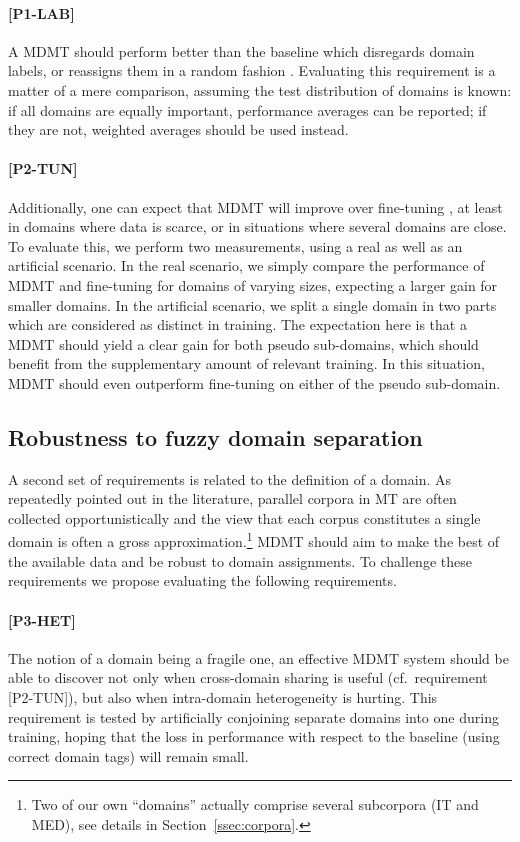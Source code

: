 \paragraph{[P1-LAB]} A MDMT should perform better than the baseline which disregards domain labels, or reassigns them in a random fashion \cite{Joshi12multidomain}. Evaluating this requirement is a matter of a mere comparison, assuming the test distribution of domains is known: if all domains are equally important, performance averages can be reported; if they are not, weighted averages should be used instead.

\paragraph{[P2-TUN]} Additionally, one can expect that MDMT will improve over fine-tuning \cite{Luong15stanford,Freitag16fast}, at least in domains where data is scarce, or in situations where several domains are close. To evaluate this, we perform two measurements, using a real as well as an artificial scenario. In the real scenario, we simply compare the performance of MDMT and fine-tuning for domains of varying sizes, expecting a larger gain for smaller domains. In the artificial scenario, we split a single domain in two parts which are considered as distinct in training. The expectation here is that a MDMT should yield a clear gain for both pseudo sub-domains, which should benefit from the supplementary amount of relevant training. In this situation, MDMT should even outperform fine-tuning on either of the pseudo sub-domain.

\subsection{Robustness to fuzzy domain separation \label{ssec:robusness}}
A second set of requirements is related to the definition of a domain. As repeatedly pointed out in the literature, parallel corpora in MT are often collected opportunistically and the view that each corpus constitutes a single domain is often a gross approximation.\footnote{Two of our own ``domains'' actually comprise several subcorpora (IT and MED), see details in Section~\ref{ssec:corpora}.} MDMT should aim to make the best of the available data and be robust to domain assignments. To challenge these requirements we propose evaluating the following requirements.

\paragraph{[P3-HET]}
The notion of a domain being a fragile one, an effective MDMT system should be able to discover not only when cross-domain sharing is useful (cf.\ requirement [P2-TUN]), but also when intra-domain heterogeneity is hurting. This requirement is tested by artificially conjoining separate domains into one during training, hoping that the loss in performance with respect to the baseline (using correct domain tags) will remain small.

